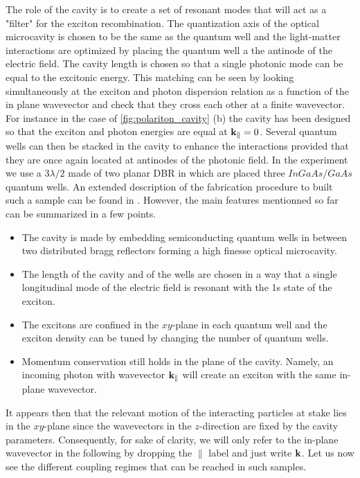 The role of the cavity is to create a set of resonant modes that will act as a "filter" for the exciton recombination. 
The quantization axis of the optical microcavity is chosen to be the same as the quantum well and the light-matter
interactions are optimized by placing the quantum well a the antinode of the electric field. The cavity length is chosen so that a single photonic mode can be equal to the excitonic energy.
This matching can be seen by looking simultaneously at the exciton and photon dispersion relation as a function of the in plane wavevector and check that they cross each other at a finite wavevector. For instance in the case of \autoref{fig:polariton_cavity} (b) the cavity has been designed so that the exciton and photon energies are equal at $\mathbf{k}_\parallel=0$.
Several quantum wells can then be stacked in the cavity to enhance the interactions provided that they are once again located at antinodes of the photonic field.
In the experiment we use a $3\lambda/2$ made of two planar DBR in which are placed three $InGaAs/GaAs$ quantum wells. An extended description of the fabrication procedure to built such a sample can be
found in \cite{maitre_thesis}. However, the main features mentionned so far can be summarized in a few points.

\begin{tcolorbox}[infernoSummary]
    \begin{itemize}
        \item The cavity is made by embedding semiconducting quantum wells in between two distributed bragg reflectors forming a high finesse optical microcavity.
        \item The length of the cavity and of the wells are chosen in a way that a single longitudinal mode of the electric field is resonant with the 1s state of the exciton.
        \item The excitons are confined in the $xy$-plane in each quantum well and the exciton density can be tuned by changing the number of quantum wells.
        \item Momentum conservation still holds in the plane of the cavity. Namely, an incoming photon with wavevector $\mathbf{k}_\parallel$ will create an exciton with the same in-plane wavevector. 
    \end{itemize}
    \end{tcolorbox}
It appears then that the relevant motion of the interacting particles at stake lies in the $xy$-plane since the wavevectors in 
the  $z$-direction are fixed by the cavity parameters. Consequently, for sake of clarity, we will only refer to the in-plane wavevector in the following
by dropping the $\parallel$ label and just write $\mathbf{k}$.
Let us now see the different coupling regimes that can be reached in such samples. 



